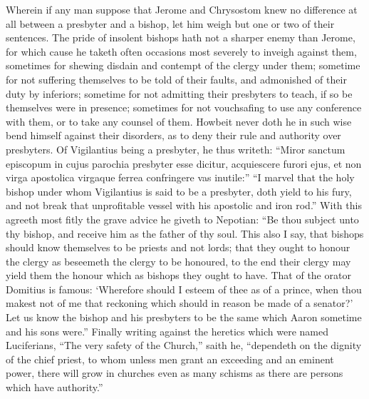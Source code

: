 Wherein if any man suppose that Jerome and Chrysostom knew no difference at all between a presbyter and a bishop, let him weigh but one or two of their sentences. The pride of insolent bishops hath not a sharper enemy than Jerome, for which cause he taketh often occasions most severely to inveigh against them, sometimes for shewing disdain and contempt of the clergy under them; sometime for not suffering themselves to be told of their faults, and admonished of their duty by inferiors; sometime for not admitting their presbyters to teach, if so be themselves were in presence; sometimes for not vouchsafing to use any conference with them, or to take any counsel of them. Howbeit never doth he in such wise bend himself against their disorders, as to deny their rule and authority over presbyters. Of Vigilantius being a presbyter, he thus writeth: “Miror sanctum episcopum in cujus parochia presbyter esse dicitur, acquiescere furori ejus, et non virga apostolica virgaque ferrea confringere vas inutile:” “I marvel that the holy bishop under whom Vigilantius is said to be a presbyter, doth yield to his fury, and not break that unprofitable vessel with his apostolic and iron rod.” With this agreeth most fitly the grave advice he giveth to Nepotian: “Be  thou subject unto thy bishop, and receive him as the father of thy soul. This also I say, that bishops should know themselves to be priests and not lords; that they ought to honour the clergy as beseemeth the clergy to be honoured, to the end their clergy may yield them the honour which as bishops they ought to have. That of the orator Domitius is famous: ‘Wherefore should I esteem of thee as of a prince, when thou makest not of me that reckoning which should in reason be made of a senator?’ Let us know the bishop and his presbyters to be the same which Aaron sometime and his sons were.” Finally writing against the heretics which were named Luciferians, “The very safety of the Church,” saith he, “dependeth on the dignity of the chief priest, to whom unless men grant an exceeding and an eminent power, there will grow in churches even as many schisms as there are persons which have authority.”

